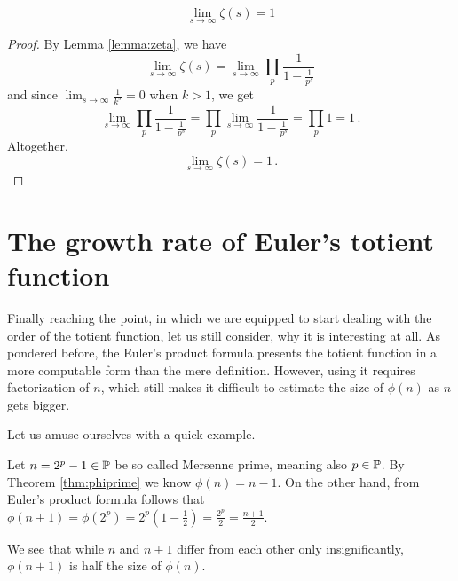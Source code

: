 \documentclass{article}
\begin{document}
\begin{lemma}
\label{lemma:zetalim}
\begin{equation*}
    \lim_{s\rightarrow\infty} \zeta(s) = 1
\end{equation*}

\begin{proof}
By Lemma \ref{lemma:zeta}, we have
\begin{equation*}
    \lim_{s\rightarrow\infty} \zeta(s) = \lim_{s\rightarrow\infty} \prod_p \frac{1}{1-\frac{1}{p^s}}
\end{equation*}
and since $\lim_{s\rightarrow\infty}\frac{1}{k^s}=0$ when $k>1$, we get
\begin{equation*}
    \lim_{s\rightarrow\infty} \prod_p \frac{1}{1-\frac{1}{p^s}} = \prod_p \lim_{s\rightarrow\infty} \frac{1}{1-\frac{1}{p^s}} = \prod_p 1 = 1\,.
\end{equation*}
Altogether,
\begin{equation*}
    \lim_{s\rightarrow\infty} \zeta(s) = 1\,.
\end{equation*}
\end{proof}
\end{lemma}

\section{The growth rate of Euler's totient function}

Finally reaching the point, in which we are equipped to start dealing with the order of the totient function, let us still consider, why it is interesting at all. As pondered before, the Euler's product formula presents the totient function in a more computable form than the mere definition. However, using it requires factorization of $n$, which still makes it difficult to estimate the size of $\phi(n)$ as $n$ gets bigger.

Let us amuse ourselves with a quick example.

\begin{example}
Let $n = 2^p - 1 \in \mathbb{P}$ be so called Mersenne prime, meaning also $p \in \mathbb{P}$. By Theorem \ref{thm:phiprime} we know $\phi(n) = n - 1$. On the other hand, from Euler's product formula follows that $\phi(n+1) = \phi(2^p) = 2^p(1-\frac{1}{2}) = \frac{2^p}{2} = \frac{n+1}{2}$.

We see that while $n$ and $n+1$ differ from each other only insignificantly, $\phi(n+1)$ is half the size of $\phi(n)$.
\end{example}
\end{document}
